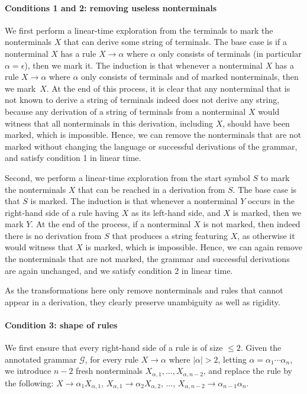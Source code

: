 \paragraph{Conditions 1 and 2: removing useless nonterminals}
We first perform a linear-time exploration from the terminals to mark the
nonterminals $X$ that can derive some string of terminals. The base case is if a nonterminal
$X$ has a rule $X \rightarrow \alpha$ where $\alpha$ only consists of terminals
(in particular $\alpha = \epsilon$), then we mark it.
The induction is that whenever a nonterminal $X$ has a rule $X
\rightarrow \alpha$ where $\alpha$ only consists of terminals and of
marked nonterminals, then we mark~$X$. At the end of this process, it is clear that any nonterminal
that is not known to derive a string of terminals indeed does not derive any
string, because any derivation of a string of terminals from a nonterminal $X$
would witness that all nonterminals in this derivation, including $X$, should
have been marked, which is impossible. Hence, we can remove the nonterminals
that are not marked without changing the language or
successful derivations of the grammar, and satisfy condition 1 in linear time.

Second, we perform a linear-time exploration from the start symbol $S$ to mark the
nonterminals $X$ that can be reached in a derivation from $S$. The base case is
that $S$ is marked. The induction is that whenever a nonterminal $Y$ occurs in
the right-hand side of a rule having $X$ as its left-hand side, and $X$ is
marked, then we mark $Y$. At the end of the process, if a nonterminal $X$ is
not marked, then indeed there is no derivation from $S$ that produces a string
featuring $X$, as otherwise it would witness that $X$ is marked, which is
impossible. Hence, we can again remove the nonterminals that are not marked,
the grammar and successful derivations are again unchanged, and we
satisfy condition 2 in linear time.

As the transformations here only remove nonterminals and rules that cannot
appear in a derivation, they clearly preserve unambiguity as well as rigidity.

\paragraph{Condition 3: shape of rules}
We first ensure that every right-hand side of a rule is of size $\leq 2$.
Given the annotated grammar $\mathcal{G}$, for every rule $X \rightarrow \alpha$ where
$|\alpha| > 2$, letting $\alpha = \alpha_1\cdots\alpha_n$,
we introduce $n-2$ fresh nonterminals $X_{\alpha,1},
\ldots, X_{\alpha,n-2}$, and replace the rule by the following: $X
\rightarrow \alpha_1 X_{\alpha,1}$, $X_{\alpha,1} \rightarrow \alpha_2
X_{\alpha,2}$, ..., $X_{\alpha,n-2} \rightarrow \alpha_{n-1} \alpha_{n}$.

